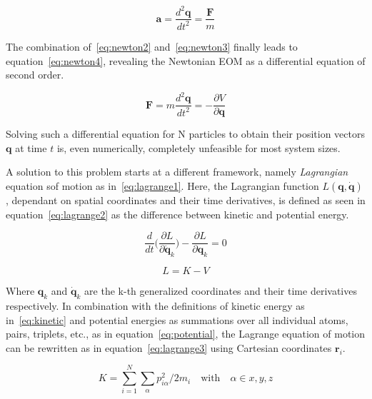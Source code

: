 \documentclass[11pt]{article}
\begin{document}
\begin{equation}
  \textbf{a} = \frac{d^2\textbf{q}}{d t^2} = \frac{\textbf{F}}{m}
  \label{eq:newton2}
\end{equation}

\bigskip

\noindent The combination of~\ref{eq:newton2} and~\ref{eq:newton3} finally leads to equation~\ref{eq:newton4}, revealing the Newtonian EOM as a differential equation of second order.

\begin{equation}
  \mathbf{F} = m\frac{d^2\mathbf{q}}{d t^2} = -\frac{\partial V}{\partial\textbf{q}}
  \label{eq:newton4}
\end{equation}

\bigskip

\noindent Solving such a differential equation for N particles to obtain their position vectors $\textbf{q}$ at time $t$ is, even numerically, completely unfeasible for most system sizes.
\\ \par \noindent A solution to this problem starts at a different framework, namely \textit{Lagrangian} equation sof motion as in~\ref{eq:lagrange1}. Here, the Lagrangian function $L(\textbf{q}, \dot{\textbf{q}})$, dependant on spatial coordinates and their time derivatives, is defined as seen in equation~\ref{eq:lagrange2} as the difference between kinetic and potential energy.

\begin{equation}
  \frac{d}{dt}\Biggl(\frac{\partial L}{\partial \dot{\textbf{q}}_k}\Biggr) - \frac{\partial L}{\partial \textbf{q}_k} = 0
  \label{eq:lagrange1}
\end{equation}

\begin{equation}
  L = K - V
  \label{eq:lagrange2}
\end{equation}

\bigskip

\noindent Where $\textbf{q}_k$ and $\dot{\textbf{q}}_k$ are the k-th generalized coordinates and their time derivatives respectively. In combination with the definitions of kinetic energy as in~\ref{eq:kinetic} and potential energies as summations over all individual atoms, pairs, triplets, etc., as in equation~\ref{eq:potential}, the Lagrange equation of motion can be rewritten as in equation~\ref{eq:lagrange3} using Cartesian coordinates $\textbf{r}_i$.

\begin{equation}
  K = \sum_{i = 1}^{N}\sum_{\alpha}^{}p_{i\alpha}^2/2m_i \quad \text{with}\quad \alpha \in x, y, z
  \label{eq:kinetic}
\end{equation}
\end{document}
